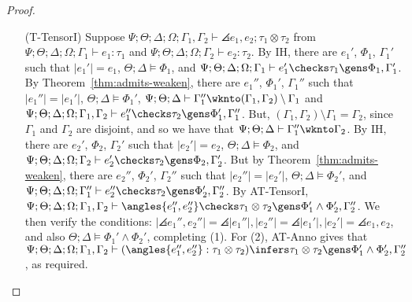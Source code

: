 \begin{proof}
\begin{itemize}
  \item[(T-TensorI)] Suppose $\Psi ; \Theta ; \Delta ; \Omega ; \Gamma_1,\Gamma_2\vdash \angles{e_1,e_2} ; \tau_1 \otimes \tau_2$ from $\Psi ; \Theta ; \Delta ; \Omega ; \Gamma_1\vdash e_1 : \tau_1$ and $\Psi ; \Theta ; \Delta ; \Omega ; \Gamma_2\vdash e_2 : \tau_2$.
  By IH, there are $e_1'$, $\Phi_1$, $\Gamma_1'$ such that $|e_1'| = e_1$, $\Theta ; \Delta \vDash \Phi_1$, and $\Psi ; \Theta ; \Delta ; \Omega ; \Gamma_1 \vdash e_1' \checks \tau_1 \gens \Phi_1,\Gamma_1'$. By Theorem~\ref{thm:admits-weaken}, there are $e_1''$, $\Phi_1'$, $\Gamma_1''$ such that $|e_1''| = |e_1'|$, $\Theta ; \Delta \vDash \Phi_1'$, $\Psi ; \Theta ; \Delta \vdash \Gamma_1'' \wknto (\Gamma_1,\Gamma_2) \setminus \Gamma_1$ and $\Psi ; \Theta ; \Delta ;\Omega ; \Gamma_1,\Gamma_2 \vdash e_1'' \checks \tau_2 \gens \Phi_1',\Gamma_1''$. But, $(\Gamma_1,\Gamma_2) \setminus \Gamma_1 = \Gamma_2$, since $\Gamma_1$ and $\Gamma_2$ are disjoint, and so we have that $\Psi ; \Theta ; \Delta \vdash \Gamma_1'' \wknto \Gamma_2$.
  By IH, there are $e_2'$, $\Phi_2$, $\Gamma_2'$ such that $|e_2'| = e_2$, $\Theta ; \Delta \vDash \Phi_2$,  and $\Psi ; \Theta ; \Delta ; \Omega ; \Gamma_2 \vdash e_2' \checks \tau_2 \gens \Phi_2,\Gamma_2'$. But by Theorem~\ref{thm:admits-weaken}, there are $e_2''$, $\Phi_2'$, $\Gamma_2''$ such that $|e_2''| = |e_2'|$, $\Theta ; \Delta \vDash \Phi_2'$, and $\Psi ; \Theta ; \Delta ; \Omega ; \Gamma_1'' \vdash e_2'' \checks \tau_2 \gens \Phi_2', \Gamma_2''$. By AT-TensorI,
  $\Psi ; \Theta ; \Delta ; \Omega ; \Gamma_1,\Gamma_2 \vdash \angles{e_1'',e_2''} \checks \tau_1 \otimes \tau_2 \gens \Phi_1' \wedge \Phi_2', \Gamma_2''$.
  We then verify the conditions: $|\angles{e_1'',e_2''}| = \angles{|e_1''|,|e_2''|} = \angles{|e_1'|,|e_2'|} = \angles{e_1,e_2}$, and also $\Theta ; \Delta \vDash \Phi_1' \wedge \Phi_2'$, completing (1). For (2), AT-Anno gives that $\Psi ; \Theta ; \Delta ; \Omega ; \Gamma_1,\Gamma_2 \vdash (\angles{e_1'',e_2''} : \tau_1 \otimes \tau_2) \infers \tau_1 \otimes \tau_2 \gens \Phi_1' \wedge \Phi_2', \Gamma_2''$, as required.
  

\end{itemize}
\end{proof}
